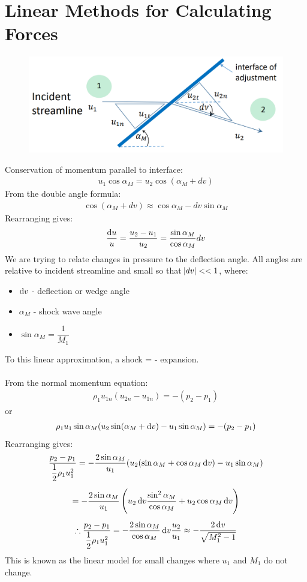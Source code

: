 \section{Linear Methods for Calculating Forces}
\begin{figure}[H]
    \centering
    \includegraphics[width = 0.85 \textwidth]{./img/diagram34.png}
    \caption{}
\end{figure}
Conservation of momentum parallel to interface:
\begin{gather}
    u_1 \cos\alpha_M = u_2 \cos(\alpha_M + dv)
\end{gather}
From the double angle formula:
\begin{gather}
    \cos(\alpha_M + dv) \approx \cos\alpha_M - dv\sin\alpha_M
\end{gather}
Rearranging gives:
\begin{gather}
    \frac{\dif u}{u} = \frac{u_2-u_1}{u_2} = \frac{\sin\alpha_M}{\cos\alpha_M}dv
\end{gather}
We are trying to relate changes in pressure to the deflection angle.
All angles are relative to incident streamline and small so that $\abs{dv}<<1$, where:
\begin{itemize}[noitemsep]
    \item $\dif v$ - deflection or wedge angle
    \item $\alpha_M$ - shock wave angle
    \item $\sin\alpha_M = \dfrac{1}{M_1}$
\end{itemize}
To this linear approximation, a shock = - expansion.
\\\\
From the normal momentum equation:
\begin{gather}
    \rho_1 u_{1n} (u_{2n}-u_{1n}) = -(p_2-p_1)
\end{gather}
or
\begin{gather}
    \rho_1 u_1 \sin\alpha_M (u_2\sin(\alpha_M + \dif v)-u_1\sin\alpha_M) = -(p_2-p_1)
\end{gather}
Rearranging gives:
\begin{gather}
    \frac{p_2-p_1}{\dfrac{1}{2}\rho_1 u_1^2} = -\frac{2\sin\alpha_M}{u_1}(u_2(\sin\alpha_M + \cos\alpha_M \dif v) - u_1\sin\alpha_M) \\[5pt]
    = -\frac{2\sin\alpha_M}{u_1} \left(u_2 \dif v \frac{\sin^2 \alpha_M}{\cos\alpha_M} + u_2\cos\alpha_M \dif v\right) \\[5pt]
    \therefore \frac{p_2-p_1}{\dfrac{1}{2}\rho_1 u_1^2} = -\frac{2\sin\alpha_M}{\cos \alpha_M} \dif v \frac{u_2}{u_1} \approx -\frac{2\dif v}{\sqrt{M_1^2-1}}
\end{gather}
This is known as the linear model for small changes where $u_1$ and $M_1$ do not change.

